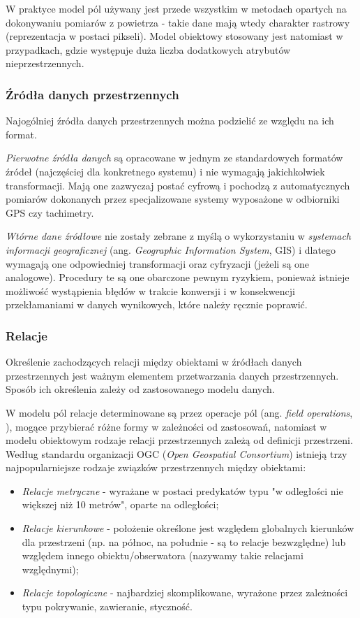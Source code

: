 \documentclass[12pt]{article}
\begin{document}
W praktyce model pól używany jest przede wszystkim w metodach opartych na dokonywaniu pomiarów z powietrza - takie dane mają wtedy charakter rastrowy (reprezentacja w postaci pikseli). Model obiektowy stosowany jest natomiast w przypadkach, gdzie występuje duża liczba dodatkowych atrybutów nieprzestrzennych.

\subsubsection{Źródła danych przestrzennych}

Najogólniej źródła danych przestrzennych można podzielić ze względu na ich format.

\textit{Pierwotne źródła danych} są opracowane w jednym ze standardowych formatów źródeł (najczęściej dla konkretnego systemu) i nie wymagają jakichkolwiek transformacji. Mają one zazwyczaj postać cyfrową i pochodzą z automatycznych pomiarów dokonanych przez specjalizowane systemy wyposażone w odbiorniki GPS czy tachimetry.

\textit{Wtórne dane źródłowe} nie zostały zebrane z myślą o wykorzystaniu w \textit{systemach informacji geograficznej} (ang. \textit{Geographic Information System}, GIS) i dlatego wymagają one odpowiedniej transformacji oraz cyfryzacji (jeżeli są one analogowe). Procedury te są one obarczone pewnym ryzykiem, ponieważ istnieje możliwość wystąpienia błędów w trakcie konwersji i w konsekwencji przekłamaniami w danych wynikowych, które należy ręcznie poprawić.

\subsubsection{Relacje}

Określenie zachodzących relacji między obiektami w źródłach danych przestrzennych jest ważnym elementem przetwarzania danych przestrzennych. Sposób ich określenia zależy od zastosowanego modelu danych.

W modelu pól relacje determinowane są przez operacje pól (ang. \textit{field operations}, \cite{fieldmodel}), mogące przybierać różne formy w zależności od zastosowań, natomiast w modelu obiektowym rodzaje relacji przestrzennych zależą od definicji przestrzeni. Według standardu organizacji OGC (\textit{Open Geospatial Consortium}) istnieją trzy najpopularniejsze rodzaje związków przestrzennych między obiektami:

\begin{itemize}
\item \textit{Relacje metryczne} - wyrażane w postaci predykatów typu "w odległości nie większej niż 10 metrów", oparte na odległości;
\item \textit{Relacje kierunkowe} - położenie określone jest względem globalnych kierunków dla przestrzeni (np. na północ, na południe - są to relacje bezwzględne) lub względem innego obiektu/obserwatora (nazywamy takie relacjami względnymi);
\item \textit{Relacje topologiczne} - najbardziej skomplikowane, wyrażone przez zależności typu pokrywanie, zawieranie, styczność.
\end{itemize}
\end{document}
